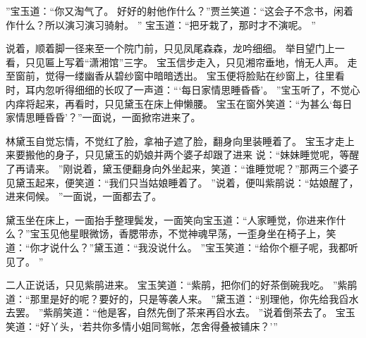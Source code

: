 ”宝玉道：“你又淘气了。
好好的射他作什么？”贾兰笑道：“这会子不念书，闲着作什么？所以演习演习骑射。
”
宝玉道：“把牙栽了，那时才不演呢。
”\par
说着，顺着脚一径来至一个院门前，只见凤尾森森，龙吟细细。
举目望门上一看，只见匾上写着“潇湘馆”三字。
宝玉信步走入，只见湘帘垂地，悄无人声。
走至窗前，觉得一缕幽香从碧纱窗中暗暗透出。
宝玉便将脸贴在纱窗上，往里看时，耳内忽听得细细的长叹了一声道：“‘每日家情思睡昏昏’。
”宝玉听了，不觉心内痒将起来，再看时，只见黛玉在床上伸懒腰。
宝玉在窗外笑道：“为甚么‘每日家情思睡昏昏’？”一面说，一面掀帘进来了。
\par
林黛玉自觉忘情，不觉红了脸，拿袖子遮了脸，翻身向里装睡着了。
宝玉才走上来要搬他的身子，只见黛玉的奶娘并两个婆子却跟了进来 
说：“妹妹睡觉呢，等醒了再请来。
”刚说着，黛玉便翻身向外坐起来，笑道：“谁睡觉呢？”那两三个婆子见黛玉起来，便笑道：“我们只当姑娘睡着了。
”说着，便叫紫鹃说：“姑娘醒了，进来伺候。
”一面说，一面都去了。
\par
黛玉坐在床上，一面抬手整理鬓发，一面笑向宝玉道：“人家睡觉，你进来作什么？”宝玉见他星眼微饧，香腮带赤，不觉神魂早荡，一歪身坐在椅子上，笑道：“你才说什么？”黛玉道：“我没说什么。
”宝玉笑道：“给你个榧子呢，我都听见了。
”\par
二人正说话，只见紫鹃进来。
宝玉笑道：“紫鹃，把你们的好茶倒碗我吃。
”紫鹃道：“那里是好的呢？要好的，只是等袭人来。
”黛玉道：“别理他，你先给我舀水去罢。
”紫鹃笑道：“他是客，自然先倒了茶来再舀水去。
”说着倒茶去了。
宝玉笑道：“好丫头，‘若共你多情小姐同鸳帐，怎舍得叠被铺床？’”
